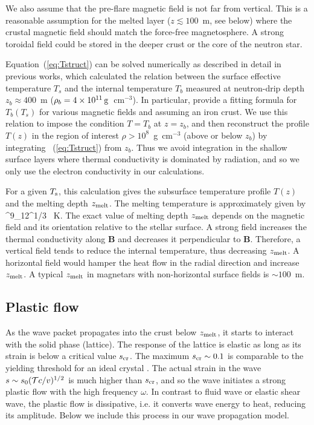 We also assume that the pre-flare magnetic field is not far from vertical. 
This is a reasonable assumption for the melted layer ($z\lesssim 100$~m, see below) where the crustal magnetic field should match the force-free magnetosphere. 
A strong toroidal field could be stored in the deeper crust or the core of the neutron star.

Equation~(\ref{eq:Tstruct}) can be solved numerically as described in detail in previous works, which calculated the relation between the surface effective temperature $T_s$ and the internal temperature $T_b$ measured at neutron-drip depth $z_b\approx 400$~m ($\rho_b = 4\times10^{11}\,\rm g$~cm$^{-3}$). 
In particular, \citet{2001A&A...374..213P} provide a fitting formula for $T_b(T_s)$ for various magnetic fields and assuming an iron crust. We use this relation to impose the condition $T=T_b$ at $z=z_b$, and then reconstruct the profile $T(z)$ in the region of interest $\rho>10^8$~g~cm$^{-3}$ (above or below $z_b$) by integrating \Eq~(\ref{eq:Tstruct}) from $z_b$. 
Thus we avoid integration in the shallow surface layers where thermal conductivity is dominated by radiation, and so we only use the electron conductivity in our calculations. 

For a given $T_{\rm s}$, this calculation gives the subsurface temperature profile $T(z)$ and the melting depth $z_{\rm melt}$. 
The melting temperature is approximately given by 
\beq
  \Tm{}^9\rho_{12}^{1/3} {\rm ~K}.
\eeq 
The exact value of melting depth $z_{\rm melt}$ depends on the magnetic field and its orientation relative to the stellar surface. A strong field increases the thermal conductivity along ${\mathbf B}$ and decreases it perpendicular to ${\mathbf B}$. 
Therefore, a vertical field tends to reduce the internal temperature, thus decreasing $z_{\rm melt}$. 
A horizontal field would hamper the heat flow in the radial direction and increase $z_{\rm melt}$. 
A typical $z_{\rm melt}$ in magnetars with non-horizontal surface fields is $\sim 100$~m.

\subsection{Plastic flow}

As the wave packet propagates into the crust below $z_{\rm melt}$, it starts to interact with the solid phase (lattice). 
The response of the lattice is elastic as long as its strain is below a critical value $s_{\rm cr}$. 
The maximum $s_{\rm cr}\sim 0.1$ is comparable to the yielding threshold for an ideal crystal \citep{2009PhRvL.102s1102H}. 
The actual strain in the wave $s\sim s_0({\mathcal T} c/v)^{1/2}$ is much higher than $s_{\rm cr}$, and so the wave initiates a strong plastic flow with the high frequency $\omega$.
In contrast to fluid \alfven wave or elastic shear wave, the plastic flow is dissipative, i.e. it converts wave energy to heat, reducing its amplitude.
Below we include this process in our wave propagation model.

